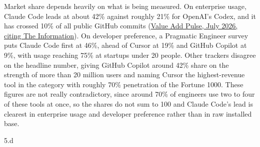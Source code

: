 \begin{answer}
  Market share depends heavily on what is being measured. On enterprise usage, Claude Code leads at
  about 42\% against roughly 21\% for OpenAI's Codex, and it has crossed 10\% of all public GitHub
  commits
  (\href{https://valueaddvc.com/pulse/anthropic-claude-code-market-share-2026}{Value Add Pulse,
  July 2026, citing The Information}). On developer preference, a Pragmatic Engineer survey puts
  Claude Code first at 46\%, ahead of Cursor at 19\% and GitHub Copilot at 9\%, with usage reaching
  75\% at startups under 20 people. Other trackers disagree on the headline number, giving GitHub
  Copilot around 42\% share on the strength of more than 20 million users and naming Cursor the
  highest-revenue tool in the category with roughly 70\% penetration of the Fortune 1000. These
  figures are not really contradictory, since around 70\% of engineers use two to four of these
  tools at once, so the shares do not sum to 100 and Claude Code's lead is clearest in enterprise
  usage and developer preference rather than in raw installed base.
\end{answer}

\LARGE
5.d
\normalsize

